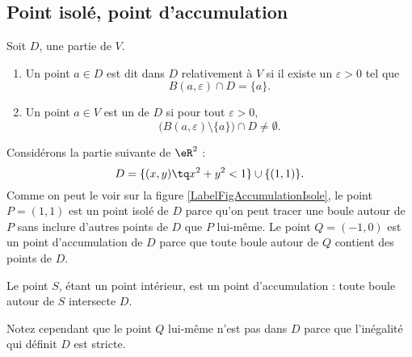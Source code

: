 \subsection{Point isolé, point d'accumulation}

\begin{definition}
	Soit $D$, une partie de $V$.
	\begin{enumerate}
		\item
			Un point $a\in D$ est dit  dans $D$ relativement à $V$ si il existe un $\varepsilon>0$ tel que
			\begin{equation}
				B(a,\varepsilon)\cap D=\{ a \}.
			\end{equation}
		\item
			Un point $a\in V$ est un  de $D$ si pour tout $\varepsilon>0$,
			\begin{equation}
				\Big( B(a,\varepsilon)\setminus\{ a \}\Big)\cap D\neq \emptyset.
			\end{equation}
	\end{enumerate}
\end{definition}

\newcommand{\CaptionFigAccumulationIsole}{L'ensemble décrit par l'équation \eqref{Eq2807BouleIso}. Le point $P$ est un point isolé de $D$, tandis que  les points $S$ et $Q$ sont des points d'accumulation.}


\begin{example}
	Considérons la partie suivante de $\eR^2$ :
	\begin{equation}	\label{Eq2807BouleIso}
		D=\{ (x,y)\tq x^2+y^2<1\}\cup\{ (1,1) \}.
	\end{equation}
	Comme on peut le voir sur la figure \ref{LabelFigAccumulationIsole}, le point $P=(1,1)$ est un point isolé de $D$ parce qu'on peut tracer une boule autour de $P$ sans inclure d'autres points de $D$ que $P$ lui-même. Le point $Q=(-1,0)$ est un point d'accumulation de $D$ parce que toute boule autour de $Q$ contient des points de $D$.

    Le point $S$, étant un point intérieur, est un point d'accumulation : toute boule autour de $S$ intersecte $D$.
    
    Notez cependant que le point $Q$ lui-même n'est pas dans $D$ parce que l'inégalité qui définit $D$ est stricte.
\end{example}

